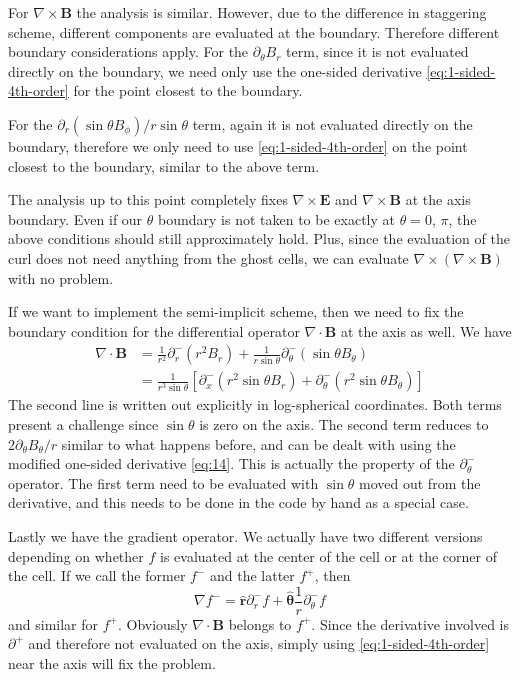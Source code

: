 For $\nabla\times \mathbf{B}$ the analysis is similar. However, due to
the difference in staggering scheme, different components are
evaluated at the boundary. Therefore different boundary considerations
apply. For the $\partial_{\theta}B_r$ term, since it is not evaluated
directly on the boundary, we need only use the one-sided derivative
\eqref{eq:1-sided-4th-order} for the point closest to the boundary.

For the $\partial_r(\sin\theta B_{\phi})/r\sin\theta$ term, again it
is not evaluated directly on the boundary, therefore we only need to
use \eqref{eq:1-sided-4th-order} on the point closest to the boundary,
similar to the above term.

The analysis up to this point completely fixes $\nabla\times
\mathbf{E}$ and $\nabla\times \mathbf{B}$ at the axis boundary. Even
if our $\theta$ boundary is not taken to be exactly at $\theta = 0$,
$\pi$, the above conditions should still approximately hold. Plus,
since the evaluation of the curl does not need anything from the ghost
cells, we can evaluate $\nabla\times(\nabla\times \mathbf{B})$ with no
problem.

If we want to implement the semi-implicit scheme, then we need to fix
the boundary condition for the differential operator $\nabla\cdot
\mathbf{B}$ at the axis as well. We have
\begin{equation}
  \begin{split}
        \nabla\cdot \mathbf{B} &= \frac{1}{r^2}\partial_r^-(r^2B_r) + \frac{1}{r\sin\theta}\partial_{\theta}^-(\sin\theta B_{\theta}) \\
        &= \frac{1}{r^3\sin\theta}\left[ \partial_x^-(r^2\sin\theta B_r) + \partial_{\theta}^-(r^2\sin\theta B_{\theta}) \right]
    \end{split}
\end{equation}
The second line is written out explicitly in log-spherical
coordinates. Both terms present a challenge since $\sin\theta$ is zero
on the axis. The second term reduces to
$2\partial_{\theta}B_{\theta}/r$ similar to what happens before, and
can be dealt with using the modified one-sided derivative
\eqref{eq:14}. This is actually the property of the
$\partial_{\theta}^-$ operator. The first term need to be evaluated
with $\sin\theta$ moved out from the derivative, and this needs to be
done in the code by hand as a special case.

Lastly we have the gradient operator. We actually have two different
versions depending on whether $f$ is evaluated at the center of the
cell or at the corner of the cell. If we call the former $f^-$ and the
latter $f^+$, then
\begin{equation}
  \nabla f^- = \hat{\mathbf{r}}\partial_r^-f + \hat{\bm{\theta}}\frac{1}{r}\partial_{\theta}^-f
\end{equation}
and similar for $f^+$. Obviously $\nabla\cdot \mathbf{B}$ belongs to $f^+$.
Since the derivative involved is $\partial^+$ and therefore not
evaluated on the axis, simply using \eqref{eq:1-sided-4th-order} near
the axis will fix the problem.


